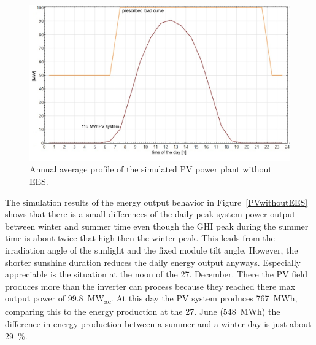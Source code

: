 \begin{figure}[htbp]  
\centering
\includegraphics[width=0.8\linewidth]{FIG/PVwithoutEESanual}
\caption[Annual average profile of the simulated PV power plant without EES.]{Annual average profile of the simulated PV power plant without EES.}\label{PVwithoutEESanual}
\end{figure}
The simulation results of the energy output behavior in Figure~\ref{PVwithoutEES} shows that there is a small differences of the daily peak system power output between winter and summer time even though the GHI peak during the summer time is about twice that high then the winter peak. This leads from the irradiation angle of the sunlight and the fixed module tilt angle. However, the shorter sunshine duration reduces the daily energy output anyways. Especially appreciable is the situation at the noon of the 27. December. There the PV field produces more than the inverter can process because they reached there max output power of 99.8~MW\textsubscript{ac}. At this day the PV system produces 767~MWh, comparing this to the energy production at the 27. June (548~MWh) the difference in energy production between a summer and a winter day is just about 29~\%.

